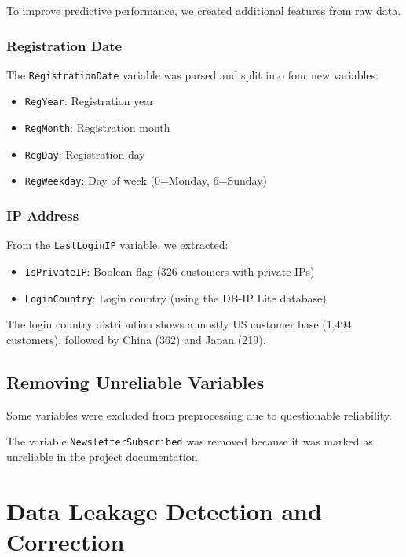\documentclass[12pt,a4paper]{article}
\begin{document}
To improve predictive performance, we created additional features from raw data.

\subsubsection{Registration Date}
The \texttt{RegistrationDate} variable was parsed and split into four new variables:
\begin{itemize}
    \item \texttt{RegYear}: Registration year
    \item \texttt{RegMonth}: Registration month
    \item \texttt{RegDay}: Registration day
    \item \texttt{RegWeekday}: Day of week (0=Monday, 6=Sunday)
\end{itemize}

\subsubsection{IP Address}
From the \texttt{LastLoginIP} variable, we extracted:
\begin{itemize}
    \item \texttt{IsPrivateIP}: Boolean flag (326 customers with private IPs)
    \item \texttt{LoginCountry}: Login country (using the DB-IP Lite database)
\end{itemize}

The login country distribution shows a mostly US customer base (1,494 customers), followed by China (362) and Japan (219).

\subsection{Removing Unreliable Variables}

Some variables were excluded from preprocessing due to questionable reliability.

The variable \texttt{NewsletterSubscribed} was removed because it was marked as unreliable in the project documentation.

\section{Data Leakage Detection and Correction}
\end{document}
